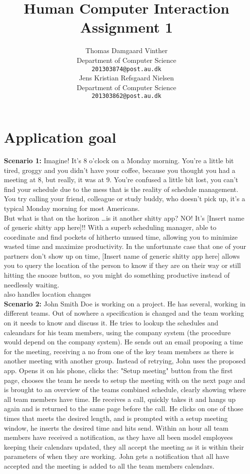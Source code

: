 \documentclass{article}
\title{Human Computer Interaction Assignment 1}
\author{
  Thomas Damgaard Vinther\\
  Department of Computer Science\\
  \texttt{201303874@post.au.dk} \\
   \And
  Jens Kristian Refsgaard Nielsen \\
  Department of Computer Science\\
  \texttt{201303862@post.au.dk} \\
}
\begin{document}
\maketitle
\section{Application goal}
\textbf{Scenario 1: }Imagine! It's 8 o'clock on a Monday morning. You're a little bit tired, groggy and you didn't have your coffee, because you thought you had a meeting at 8, but really, it was at 9. You're confused a little bit lost, you can't find your schedule due to the mess that is the reality of schedule management. You try calling your friend, colleague or study buddy, who doesn't pick up, it's a typical Monday morning for most Americans.  \\
But what is that on the horizon \dots is it another shitty app? NO! It's [Insert name of generic shitty app here]!! With a superb scheduling manager, able to coordinate and find pockets of hitherto unused time, allowing you to minimize wasted time and maximize productivity. In the unfortunate case that one of your partners don't show up on time, [Insert name of generic shitty app here] allows you to query the location of the person to know if they are on their way or still hitting the snooze button, so you might do something productive instead of needlessly waiting. \\also handles location changes\\

\textbf{Scenario 2: }John Smith Doe is working on a project. He has several, working in different teams. Out of nowhere a specification is changed and the team working on it needs to know and discuss it. He tries to lookup the schedules and caleandars for his team members, using the company system (the procedure would depend on the company system). He sends out an email proposing a time for the meeting, receiving a no from one of the key team members as there is another meeting with another group. Instead of retrying, John uses the proposed app. Opens it on his phone, clicks the: "Setup meeting" button from the first page, chooses the team he needs to setup the meeting with on the next page and is brought to an overview of the teams combined schedule, clearly showing where all team members have time. He receives a call, quickly takes it and hangs up again and is returned to the same page before the call. He clicks on one of those times that meets the desired length, and is prompted with a setup meeting window, he inserts the desired time and hits send. Within an hour all team members have received a notification, as they have all been model employees keeping their calendars updated, they all accept the meeting as it is within their parameters of when they are working. John gets a notification that all have accepted and the meeting is added to all the team members calendars.      
\end{document}
